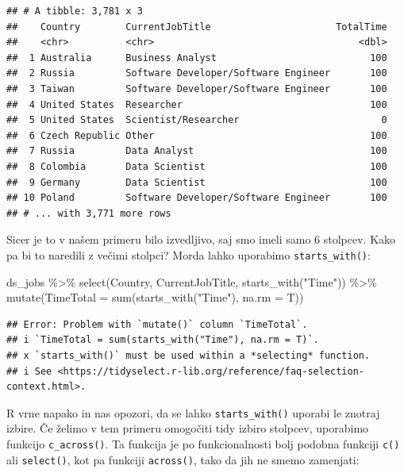 \documentclass[
]{book}
\newenvironment{Shaded}{\begin{snugshade}}{\end{snugshade}}
\newcommand{\AttributeTok}[1]{\textcolor[rgb]{0.77,0.63,0.00}{#1}}
\newcommand{\FunctionTok}[1]{\textcolor[rgb]{0.00,0.00,0.00}{#1}}
\newcommand{\NormalTok}[1]{#1}
\newcommand{\SpecialCharTok}[1]{\textcolor[rgb]{0.00,0.00,0.00}{#1}}
\newcommand{\StringTok}[1]{\textcolor[rgb]{0.31,0.60,0.02}{#1}}
\begin{document}
\begin{verbatim}
## # A tibble: 3,781 x 3
##    Country        CurrentJobTitle                      TotalTime
##    <chr>          <chr>                                    <dbl>
##  1 Australia      Business Analyst                           100
##  2 Russia         Software Developer/Software Engineer       100
##  3 Taiwan         Software Developer/Software Engineer       100
##  4 United States  Researcher                                 100
##  5 United States  Scientist/Researcher                         0
##  6 Czech Republic Other                                      100
##  7 Russia         Data Analyst                               100
##  8 Colombia       Data Scientist                             100
##  9 Germany        Data Scientist                             100
## 10 Poland         Software Developer/Software Engineer       100
## # ... with 3,771 more rows
\end{verbatim}

Sicer je to v našem primeru bilo izvedljivo, saj smo imeli samo 6 stolpcev. Kako pa bi to naredili z večimi stolpci? Morda lahko uporabimo \texttt{starts\_with()}:

\begin{Shaded}
\begin{Highlighting}[]
\NormalTok{ds\_jobs }\SpecialCharTok{\%\textgreater{}\%}
  \FunctionTok{select}\NormalTok{(Country, CurrentJobTitle, }\FunctionTok{starts\_with}\NormalTok{(}\StringTok{"Time"}\NormalTok{)) }\SpecialCharTok{\%\textgreater{}\%}
  \FunctionTok{mutate}\NormalTok{(}\AttributeTok{TimeTotal =} \FunctionTok{sum}\NormalTok{(}\FunctionTok{starts\_with}\NormalTok{(}\StringTok{"Time"}\NormalTok{), }\AttributeTok{na.rm =}\NormalTok{ T))}
\end{Highlighting}
\end{Shaded}

\begin{verbatim}
## Error: Problem with `mutate()` column `TimeTotal`.
## i `TimeTotal = sum(starts_with("Time"), na.rm = T)`.
## x `starts_with()` must be used within a *selecting* function.
## i See <https://tidyselect.r-lib.org/reference/faq-selection-context.html>.
\end{verbatim}

R vrne napako in nas opozori, da se lahko \texttt{starts\_with()} uporabi le znotraj izbire. Če želimo v tem primeru omogočiti tidy izbiro stolpcev, uporabimo funkcijo \texttt{c\_across()}. Ta funkcija je po funkcionalnosti bolj podobna funkciji \texttt{c()} ali \texttt{select()}, kot pa funkciji \texttt{across()}, tako da jih ne smemo zamenjati:
\end{document}

